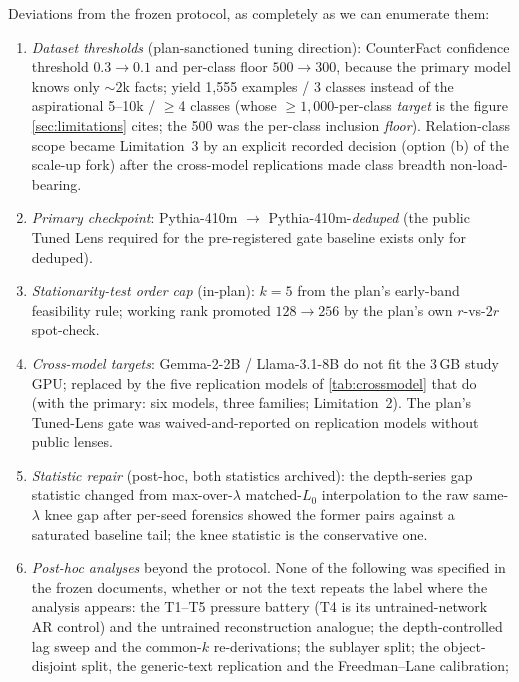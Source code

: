 \noindent Deviations from the frozen protocol, as completely as we can
enumerate them:

\begin{enumerate}
  \item \emph{Dataset thresholds} (plan-sanctioned tuning direction):
    CounterFact confidence threshold $0.3 \to 0.1$ and per-class floor
    $500 \to 300$, because the primary model knows only ${\sim}2$k facts;
    yield 1{,}555 examples / 3 classes instead of the aspirational
    5--10k / $\ge$4 classes (whose ${\ge}1{,}000$-per-class \emph{target} is
    the figure \cref{sec:limitations} cites; the 500 was the per-class
    inclusion \emph{floor}). Relation-class scope became Limitation~3 by an
    explicit recorded decision (option (b) of the scale-up fork) after the
    cross-model replications made class breadth non-load-bearing.
  \item \emph{Primary checkpoint}: Pythia-410m $\to$ Pythia-410m-\emph{deduped}
    (the public Tuned Lens required for the pre-registered gate baseline
    exists only for deduped).
  \item \emph{Stationarity-test order cap} (in-plan): $k=5$ from the plan's
    early-band feasibility rule; working rank promoted $128 \to 256$ by the
    plan's own $r$-vs-$2r$ spot-check.
  \item \emph{Cross-model targets}: Gemma-2-2B / Llama-3.1-8B do not fit the
    3\,GB study GPU; replaced by the five replication models of
    \cref{tab:crossmodel} that do (with the primary: six models, three
    families; Limitation~2). The plan's Tuned-Lens gate was
    waived-and-reported on replication models without public lenses.
  \item \emph{Statistic repair} (post-hoc, both statistics archived): the
    depth-series gap statistic changed from max-over-$\lambda$ matched-$L_0$
    interpolation to the raw same-$\lambda$ knee gap after per-seed forensics
    showed the former pairs against a saturated baseline tail; the knee
    statistic is the conservative one.
  \item \emph{Post-hoc analyses} beyond the protocol. None of the following
    was specified in the frozen documents, whether or not the text repeats
    the label where the analysis appears: the T1--T5 pressure battery (T4 is
    its untrained-network AR control) and the untrained reconstruction
    analogue; the depth-controlled lag sweep and the common-$k$
    re-derivations; the sublayer split; the object-disjoint split, the
    generic-text replication and the Freedman--Lane calibration;

\end{enumerate}
